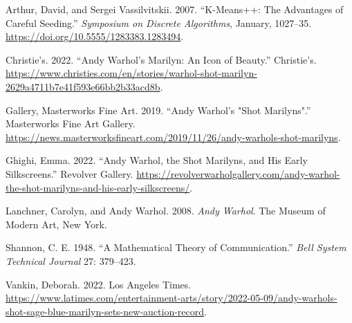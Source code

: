 \documentclass{article}
\newlength{\cslhangindent}
\newlength{\cslentryspacingunit} %
\newenvironment{CSLReferences}[2] %
 {%
  \setlength{\parindent}{0pt}
  \ifodd #1
  \let\oldpar\par
  \def\par{\hangindent=\cslhangindent\oldpar}
  \fi
  \setlength{\parskip}{#2\cslentryspacingunit}
 }%
 {}
\begin{document}
\hypertarget{refs}{}
\begin{CSLReferences}{1}{0}
\leavevmode{}%
Arthur, David, and Sergei Vassilvitskii. 2007. {``K-Means++: The
Advantages of Careful Seeding.''} \emph{Symposium on Discrete
Algorithms}, January, 1027--35.
\url{https://doi.org/10.5555/1283383.1283494}.

\leavevmode{}%
Christie's. 2022. {``Andy Warhol's Marilyn: An Icon of Beauty.''}
Christie's.
\url{https://www.christies.com/en/stories/warhol-shot-marilyn-2629a4711b7e41f593e66bb2b33acd8b}.

\leavevmode{}%
Gallery, Masterworks Fine Art. 2019. {``Andy Warhol's "Shot
Marilyns".''} Masterworks Fine Art Gallery.
\url{https://news.masterworksfineart.com/2019/11/26/andy-warhols-shot-marilyns}.

\leavevmode{}%
Ghighi, Emma. 2022. {``Andy Warhol, the Shot Marilyns, and His Early
Silkscreens.''} Revolver Gallery.
\url{https://revolverwarholgallery.com/andy-warhol-the-shot-marilyns-and-his-early-silkscreens/}.

\leavevmode{}%
Lanchner, Carolyn, and Andy Warhol. 2008. \emph{Andy Warhol}. The Museum
of Modern Art, New York.

\leavevmode{}%
Shannon, C. E. 1948. {``A Mathematical Theory of Communication.''}
\emph{Bell System Technical Journal} 27: 379--423.

\leavevmode{}%
Vankin, Deborah. 2022. Los Angeles Times.
\url{https://www.latimes.com/entertainment-arts/story/2022-05-09/andy-warhols-shot-sage-blue-marilyn-sets-new-auction-record}.

\end{CSLReferences}



\end{document}

